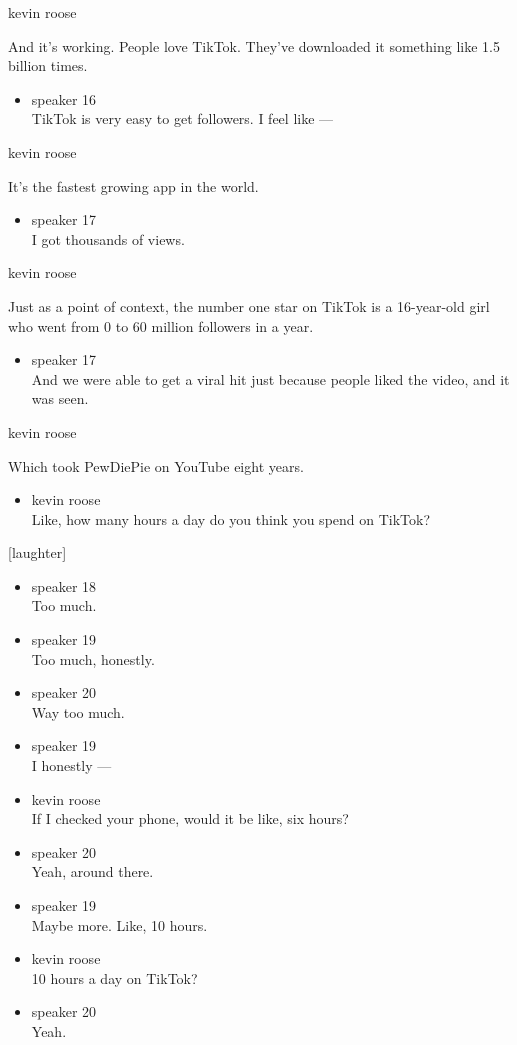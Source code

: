 kevin roose

And it's working. People love TikTok. They've downloaded it something
like 1.5 billion times.

\begin{itemize}
\tightlist
\item
  speaker 16\\
  TikTok is very easy to get followers. I feel like ---
\end{itemize}

kevin roose

It's the fastest growing app in the world.

\begin{itemize}
\tightlist
\item
  speaker 17\\
  I got thousands of views.
\end{itemize}

kevin roose

Just as a point of context, the number one star on TikTok is a
16-year-old girl who went from 0 to 60 million followers in a year.

\begin{itemize}
\tightlist
\item
  speaker 17\\
  And we were able to get a viral hit just because people liked the
  video, and it was seen.
\end{itemize}

kevin roose

Which took PewDiePie on YouTube eight years.

\begin{itemize}
\tightlist
\item
  kevin roose\\
  Like, how many hours a day do you think you spend on TikTok?
\end{itemize}

{[}laughter{]}

\begin{itemize}
\item
  speaker 18\\
  Too much.
\item
  speaker 19\\
  Too much, honestly.
\item
  speaker 20\\
  Way too much.
\item
  speaker 19\\
  I honestly ---
\item
  kevin roose\\
  If I checked your phone, would it be like, six hours?
\item
  speaker 20\\
  Yeah, around there.
\item
  speaker 19\\
  Maybe more. Like, 10 hours.
\item
  kevin roose\\
  10 hours a day on TikTok?
\item
  speaker 20\\
  Yeah.
\end{itemize}


